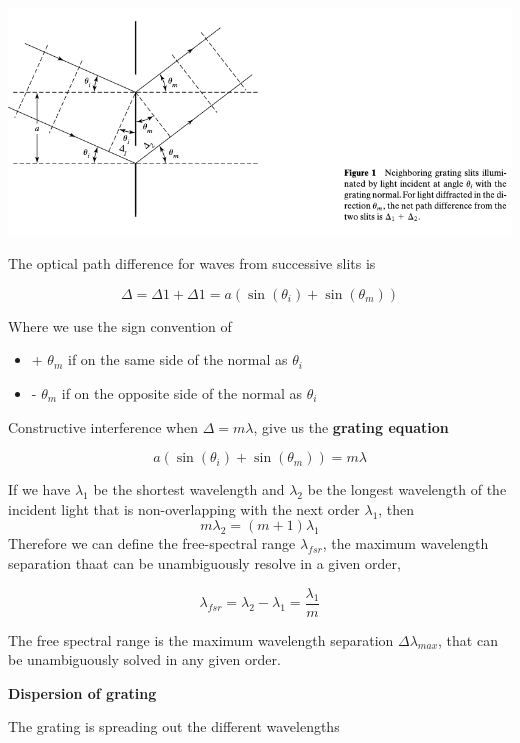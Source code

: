 \documentclass[10pt]{article}
\begin{document}
\begin{center}
    \includegraphics[scale = .7]{imgs/diffratction-fig-1.png}
\end{center}

The optical path difference for waves from successive slits is 

\[\Delta = \Delta 1 + \Delta 1 = a(\sin(\theta_i) + \sin(\theta_m))\]

Where we use the sign convention of 
\begin{itemize}
    \item + $\theta_m$ if on the same side of the normal as $\theta_i$
    \item - $\theta_m$ if on the opposite side of the normal as $\theta_i$
\end{itemize}

Constructive interference when $\Delta = m \lambda$, give us the \textbf{grating equation}

\[a(\sin(\theta_i) + \sin(\theta_m)) = m \lambda\]

If we have $\lambda_1$ be the shortest wavelength and $\lambda_2$ be the longest wavelength of the incident light that is non-overlapping with the next order $\lambda_1$, then 
\[m\lambda_2 = (m+1)\lambda_1\]
Therefore we can define the free-spectral range $\lambda_{fsr}$, the maximum wavelength separation thaat can be unambiguously resolve in a given order, 

\[\lambda_{fsr} = \lambda_2 - \lambda_1 = \frac{\lambda_1}{m}\]

The free spectral range is the maximum wavelength separation $\Delta \lambda_{max}$, that can be unambiguously solved in any given order.

\textbf{Dispersion of grating}

The grating is spreading out the different wavelengths
\end{document}
